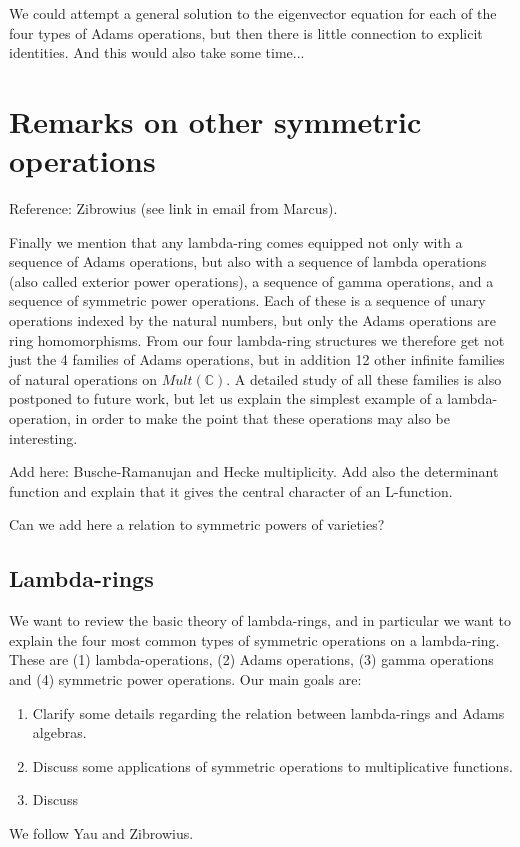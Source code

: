 \documentclass[a4paper]{article}
\theoremstyle{definition}
\theoremstyle{remark}
\begin{document}
We could attempt a general solution to the eigenvector equation for each of the four types of Adams operations, but then there is little connection to explicit identities. And this would also take some time...




\section{Remarks on other symmetric operations}

Reference: Zibrowius (see link in email from Marcus). 

Finally we mention that any lambda-ring comes equipped not only with a sequence of Adams operations, but also with a sequence of lambda operations (also called exterior power operations), a sequence of gamma operations, and a sequence of symmetric power operations. Each of these is a sequence of unary operations indexed by the natural numbers, but only the Adams operations are ring homomorphisms. From our four lambda-ring structures we therefore get not just the 4 families of Adams operations, but in addition 12 other infinite families of natural operations on $Mult(\mathbb{C})$. A detailed study of all these families is also postponed to future work, but let us explain the simplest example of a lambda-operation, in order to make the point that these operations may also be interesting.

Add here: Busche-Ramanujan and Hecke multiplicity. Add also the determinant function and explain that it gives the central character of an L-function.

Can we add here a relation to symmetric powers of varieties?


\subsection{Lambda-rings}

We want to review the basic theory of lambda-rings, and in particular we want to explain the four most common types of symmetric operations on a lambda-ring. These are (1) lambda-operations, (2) Adams operations, (3) gamma operations and (4) symmetric power operations. Our main goals are:
\begin{enumerate}
\item Clarify some details regarding the relation between lambda-rings and Adams algebras.
\item Discuss some applications of symmetric operations to multiplicative functions.
\item Discuss
\end{enumerate}
We follow Yau and Zibrowius.
\end{document}
